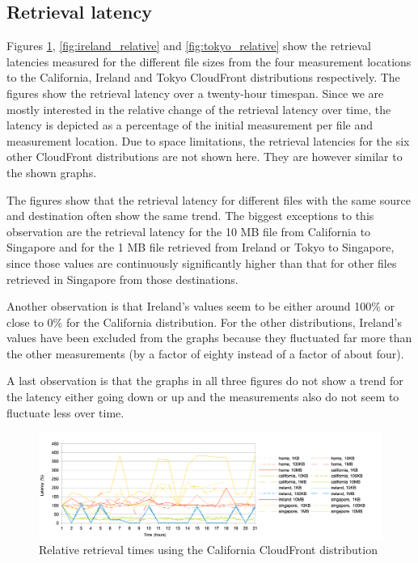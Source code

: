 \documentclass[conference]{IEEEtran}
\begin{document}
\subsection{Retrieval latency}
Figures \ref{fig:california_relative}, \ref{fig:ireland_relative} and \ref{fig:tokyo_relative} show the retrieval latencies measured for the different file sizes from the four measurement locations to the California, Ireland and Tokyo CloudFront distributions respectively. The figures show the retrieval latency over a twenty-hour timespan. Since we are mostly interested in the relative change of the retrieval latency over time, the latency is depicted as a percentage of the initial measurement per file and measurement location. Due to space limitations, the retrieval latencies for the six other CloudFront distributions are not shown here. They are however similar to the shown graphs. %

The figures show that the retrieval latency for different files with the same source and destination often show the same trend. The biggest exceptions to this observation are the retrieval latency for the 10 MB file from California to Singapore and for the 1 MB file retrieved from Ireland or Tokyo to Singapore, since those values are continuously significantly higher than that for other files retrieved in Singapore from those destinations.

Another observation is that Ireland's values seem to be either around 100\% or close to 0\% for the California distribution. For the other distributions, Ireland's values have been excluded from the graphs because they fluctuated far more than the other measurements (by a factor of eighty instead of a factor of about four).

A last observation is that the graphs in all three figures do not show a trend for the latency either going down or up and the measurements also do not seem to fluctuate less over time.




\begin{figure}[]
    \centering
    \includegraphics[width=\linewidth]{images/california_relative.png}
    \caption[]{Relative retrieval times using the California CloudFront distribution}
    \label{fig:california_relative}
\end{figure}
\end{document}
